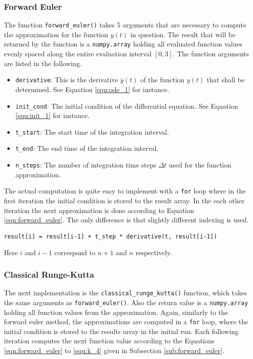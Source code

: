\documentclass{aa}
\begin{document}
\subsubsection*{Forward Euler}%
\label{ssub:forward_euler}
The function \verb+forward_euler()+ takes 5 arguments that are necessary to compute the
approximation for the function \(y(t)\) in question. The result that will be returned by the
function is a \verb+numpy.array+ holding all evaluated function values evenly spaced along the
entire evaluation interval \([0,3]\). The function arguments are listed in the following.
\begin{itemize}
    \item \verb+derivative+: This is the derivative \(\dot{y}(t)\) of the function \(y(t)\)
        that shall be determined. See Equation \ref{equ:ode_1} for instance.
    \item \verb+init_cond+: The initial condition of the differential equation. See Equation
        \ref{equ:init_1} for instance.
    \item \verb+t_start+: The start time of the integration interval.
    \item \verb+t_end+: The end time of the integration interval.
    \item \verb+n_steps+: The number of integration time steps \(\Delta t\) used for the
        function approximation.
\end{itemize}
The actual computation is quite easy to implement with a \verb+for+ loop where in the first
iteration the initial condition is stored to the result array. In the each other iteration the
next approximation is done according to Equation \ref{eqn:forward_euler}. The only difference
is that slightly different indexing is used.
\begin{lstlisting}[firstnumber=187, name=ode_solvers]
result[i] = result[i-1] + t_step * derivative(t, result[i-1])
\end{lstlisting}
Here \(i\) and \(i-1\) correspond to \(n+1\) and \(n\) respectively.

\subsubsection*{Classical Runge-Kutta}%
\label{ssub:classical_runge_kutta}
The next implementation is the \verb+classical_runge_kutta()+ function, which takes the same
arguments as \verb+forward_euler()+. Also the return value is a \verb+numpy.array+ holding all
function values from the approximation. Again, similarly to the forward euler method, the
approximations are computed in a \verb+for+ loop, where the initial condition is stored to the
results array in the initial run. Each following iteration computes the next function value
according to the Equations \ref{eqn:forward_euler} to \ref{equ:k_4} given in Subsection
\ref{sub:forward_euler}.
\end{document}
